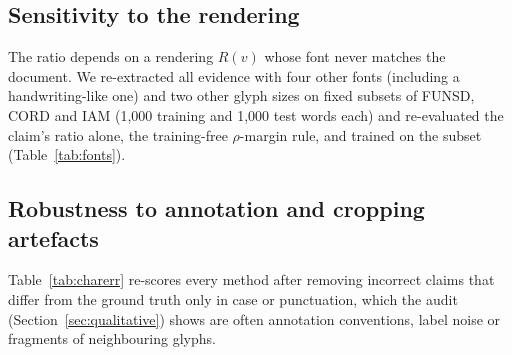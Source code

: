 \subsection{Sensitivity to the rendering}
The ratio depends on a rendering $R(v)$ whose font never matches the document. We re-extracted all evidence with four
other fonts (including a handwriting-like one) and two other glyph sizes on fixed subsets of FUNSD, CORD and IAM (1{,}000
training and 1{,}000 test words each) and re-evaluated the claim's ratio alone, the training-free $\rho$-margin rule, and
\ours{} trained on the subset (Table~\ref{tab:fonts}). \FONTSENTENCE

\begin{table}[t]\centering
\caption{\textbf{Rendering sensitivity}: AUROC of the claim's ratio $\rho_{V_1}+\rho_{V_2}$ alone, AUROC of the
training-free $\rho$-margin rule, and macro-F1 of \ours{} trained on 1{,}000 labelled words (3 seeds), for each rendering.}
\label{tab:fonts}
\footnotesize\setlength{\tabcolsep}{3pt}
\end{table}

\subsection{Robustness to annotation and cropping artefacts}
\label{sec:charerr}
Table~\ref{tab:charerr} re-scores every method after removing incorrect claims that differ from the ground truth only in
case or punctuation, which the audit (Section~\ref{sec:qualitative}) shows are often annotation conventions, label noise
or fragments of neighbouring glyphs. \CHARSENTENCE

\begin{table}[t]\centering
\caption{\textbf{AUROC on all errors / on genuine character errors only} ($k=25$). Removed: share of incorrect claims that
differ from the ground truth only in case or punctuation.}
\label{tab:charerr}
\footnotesize\setlength{\tabcolsep}{3pt}
\end{table}
